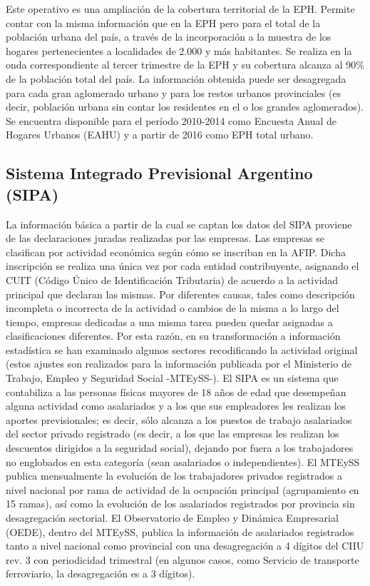 \documentclass[
  openany]{book}
\begin{document}
Este operativo es una ampliación de la cobertura territorial de la EPH.
Permite contar con la misma información que en la EPH pero para el total de la población urbana del país, a través de la incorporación a la muestra de los hogares pertenecientes a localidades de 2.000 y más habitantes.
Se realiza en la onda correspondiente al tercer trimestre de la EPH y su cobertura alcanza al 90\% de la población total del país.
La información obtenida puede ser desagregada para cada gran aglomerado urbano y para los restos urbanos provinciales (es decir, población urbana sin contar los residentes en el o los grandes aglomerados).
Se encuentra disponible para el período 2010-2014 como Encuesta Anual de Hogares Urbanos (EAHU) y a partir de 2016 como EPH total urbano.

\hypertarget{sistema-integrado-previsional-argentino-sipa}{%
\subsection{Sistema Integrado Previsional Argentino (SIPA)}\label{sistema-integrado-previsional-argentino-sipa}}

La información básica a partir de la cual se captan los datos del SIPA proviene de las declaraciones juradas realizadas por las empresas.
Las empresas se clasifican por actividad económica según cómo se inscriban en la AFIP.
Dicha inscripción se realiza una única vez por cada entidad contribuyente, asignando el CUIT (Código Único de Identificación Tributaria) de acuerdo a la actividad principal que declaran las mismas.
Por diferentes causas, tales como descripción incompleta o incorrecta de la actividad o cambios de la misma a lo largo del tiempo, empresas dedicadas a una misma tarea pueden quedar asignadas a clasificaciones diferentes.
Por esta razón, en su transformación a información estadística se han examinado algunos sectores recodificando la actividad original (estos ajustes son realizados para la información publicada por el Ministerio de Trabajo, Empleo y Seguridad Social -MTEySS-).
El SIPA es un sistema que contabiliza a las personas físicas mayores de 18 años de edad que desempeñan alguna actividad como asalariados y a los que sus empleadores les realizan los aportes previsionales; es decir, sólo alcanza a los puestos de trabajo asalariados del sector privado registrado (es decir, a los que las empresas les realizan los descuentos dirigidos a la seguridad social), dejando por fuera a los trabajadores no englobados en esta categoría (sean asalariados o independientes).
El MTEySS publica mensualmente la evolución de los trabajadores privados registrados a nivel nacional por rama de actividad de la ocupación principal (agrupamiento en 15 ramas), así como la evolución de los asalariados registrados por provincia sin desagregación sectorial.
El Observatorio de Empleo y Dinámica Empresarial (OEDE), dentro del MTEySS, publica la información de asalariados registrados tanto a nivel nacional como provincial con una desagregación a 4 dígitos del CIIU rev. 3 con periodicidad trimestral (en algunos casos, como Servicio de transporte ferroviario, la desagregación es a 3 dígitos).
\end{document}

